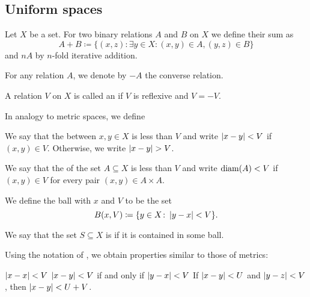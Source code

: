 \subsection{Uniform spaces}\label{subsec:uniform_spaces}

\begin{definition}\label{def:entourage}\cite[section 8.1]{Engelking1989}
  Let \( X \) be a set. For two binary relations \( A \) and \( B \) on \( X \) we define their sum as
  \begin{equation*}
    A + B \coloneqq \{ (x, z) \colon \exists y \in X: (x, y) \in A, (y, z) \in B \}
  \end{equation*}
  and \( nA \) by \( n \)-fold iterative addition.

  For any relation \( A \), we denote by \( -A \) the converse relation.

  A relation \( V \) on \( X \) is called an  if \( V \) is reflexive and \( V = -V \).

  In analogy to metric spaces, we define
  \begin{defenum}
     We say that the  between \( x, y \in X \) is less than \( V \) and write \( \left\vert x - y \right\vert < V \) if \( (x, y) \in V \). Otherwise, we write \( \left\vert x - y \right\vert > V \).

     We say that the  of the set \( A \subseteq X \) is less than \( V \) and write \( \operatorname{diam}(A) < V \) if \( (x, y) \in V \) for every pair \( (x, y) \in A \times A \).

     We define the ball with  \( x \) and  \( V \) to be the set
    \begin{equation*}
      B(x, V) \coloneqq \{ y \in X \colon \left\vert y - x \right\vert < V \}.
    \end{equation*}

     We say that the set \( S \subseteq X \) is  if it is contained in some ball.
  \end{defenum}
\end{definition}

\begin{proposition}\label{thm:entourage_simulates_metric}\cite[section 8.1]{Engelking1989}
  Using the notation of , we obtain properties similar to those of metrics:
  \begin{description}
     \( \left\vert x - x \right\vert < V \)
     \( \left\vert x - y \right\vert < V \) if and only if \( \left\vert y - x \right\vert < V \)
     If \( \left\vert x - y \right\vert < U \) and \( \left\vert y - z \right\vert < V \), then \( \left\vert x - y \right\vert < U + V \).
  \end{description}
\end{proposition}

